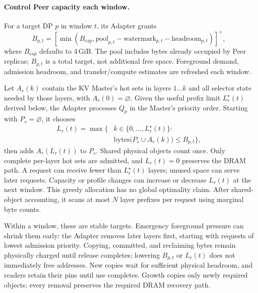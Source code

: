 \paragraph{Control Peer capacity each window.}
For a target DP $p$ in window $t$, its Adapter grants
\begin{equation}
 B_{p,t}=[\min(B_{\mathrm{cap}},\mathrm{pool}_{p,t}
              -\mathrm{watermark}_{p,t}-\mathrm{headroom}_{p,t})]^+,
 \label{eq:peer-budget}
\end{equation}
where $B_{\mathrm{cap}}$ defaults to 4\,GiB. The pool includes bytes
already occupied by Peer replicas; $B_{p,t}$ is a total target, not
additional free space. Foreground demand, admission headroom, and
transfer/compute estimates are refreshed each window.

Let $A_r(k)$ contain the KV Master's hot sets in layers $1\ldots k$
and all selector state needed by those layers, with $A_r(0)=\varnothing$.
Given the useful prefix limit $L_r^\star(t)$ derived below, the Adapter
processes $Q_p$ in the Master's priority order. Starting with $P_s=\varnothing$,
it chooses
\begin{equation}
 \begin{aligned}
 L_r(t)=\max\bigl\{&k\in\{0,\ldots,L_r^\star(t)\}:\\
                  &\mathrm{bytes}\bigl(P_s\cup A_r(k)\bigr)\le B_{p,t}\bigr\},
 \end{aligned}
 \label{eq:resident-prefix}
\end{equation}
then adds $A_r(L_r(t))$ to $P_s$. Shared physical objects count once.
Only complete per-layer hot sets are admitted, and $L_r(t)=0$ preserves
the DRAM path. A request can receive fewer than $L_r^\star(t)$ layers;
unused space can serve later requests. Capacity or profile changes can
increase or decrease $L_r(t)$ at the next window. This greedy allocation
has no global optimality claim. After shared-object accounting, it scans
at most $N$ layer prefixes per request using marginal byte counts.

Within a window, these are stable targets. Emergency foreground pressure
can shrink them early: the Adapter removes later layers first, starting
with requests of lowest admission priority. Copying, committed, and
reclaiming bytes remain physically charged until release completes;
lowering $B_{p,t}$ or $L_r(t)$ does not immediately free addresses.
New copies wait for sufficient physical headroom, and readers retain
their pins until use completes. Growth copies only newly required
objects; every removal preserves the required DRAM recovery path.
